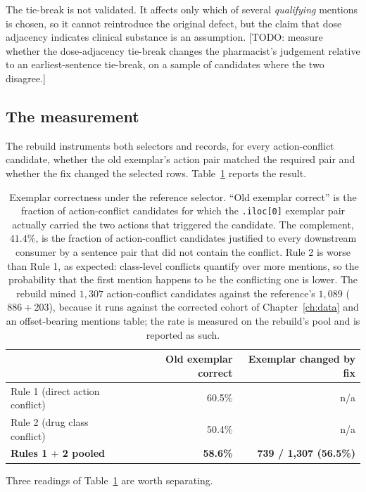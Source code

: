 The tie-break is not validated. It affects only which of several
\emph{qualifying} mentions is chosen, so it cannot reintroduce the original
defect, but the claim that dose adjacency indicates clinical substance is an
assumption. [TODO: measure whether the dose-adjacency tie-break changes the
pharmacist's judgement relative to an earliest-sentence tie-break, on a sample
of candidates where the two disagree.]

\subsection{The measurement}

The rebuild instruments both selectors and records, for every action-conflict
candidate, whether the old exemplar's action pair matched the required pair and
whether the fix changed the selected rows. Table~\ref{tab:exemplar} reports the
result.

\begin{table}[t]
\centering
\small
\begin{tabular}{lrr}
\toprule
 & \textbf{Old exemplar correct} & \textbf{Exemplar changed by fix} \\
\midrule
Rule 1 (direct action conflict) & 60.5\% & n/a \\
Rule 2 (drug class conflict)    & 50.4\% & n/a \\
\midrule
\textbf{Rules 1 $+$ 2 pooled}   & \textbf{58.6\%} & \textbf{739 / 1,307 (56.5\%)} \\
\bottomrule
\end{tabular}
\caption{Exemplar correctness under the reference selector. ``Old exemplar
correct'' is the fraction of action-conflict candidates for which the
\texttt{.iloc[0]} exemplar pair actually carried the two actions that triggered
the candidate. The complement, $41.4\%$, is the fraction of action-conflict
candidates justified to every downstream consumer by a sentence pair that did
not contain the conflict. Rule 2 is worse than Rule 1, as expected: class-level
conflicts quantify over more mentions, so the probability that the first mention
happens to be the conflicting one is lower. The rebuild mined $1{,}307$
action-conflict candidates against the reference's $1{,}089$
($886 + 203$), because it runs against the corrected cohort of
Chapter~\ref{ch:data} and an offset-bearing mentions table; the rate is measured
on the rebuild's pool and is reported as such.}
\label{tab:exemplar}
\end{table}

Three readings of Table~\ref{tab:exemplar} are worth separating.


